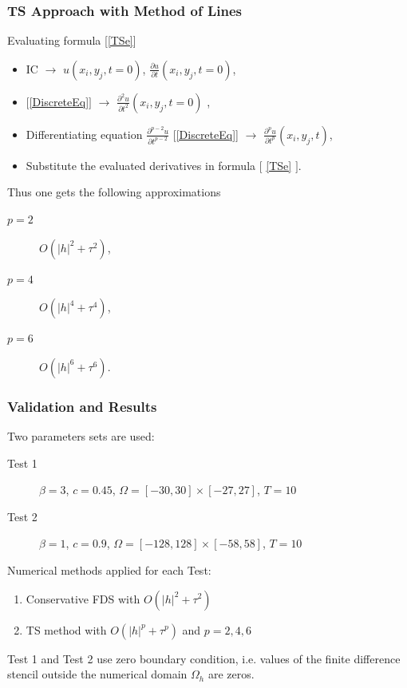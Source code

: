 \documentclass{beamer}
\begin{document}
\begin{frame}
\frametitle{TS Approach with Method of Lines}
Evaluating formula [\ref{TSe}]
\begin{itemize}
 \item IC $\rightarrow$ $u(x_i, y_j, t=0)$, $\frac{ \partial u }{ \partial t }(x_i, y_j, t=0)$,
 \item $[$\ref{DiscreteEq}$]$ $\rightarrow$ $\frac{ \partial^2 u }{ \partial t^2 }(x_i, y_j, t=0)$ ,
 \item Differentiating equation $\frac{ \partial^{p-2} u }{ \partial t^{p-2} }$ [\ref{DiscreteEq}] $\rightarrow$  $\frac{ \partial^p u }{ \partial t^p }(x_i, y_j, t)$,
 \item Substitute the evaluated derivatives in formula $[$ \ref{TSe} $]$.
\end{itemize}


Thus one gets the following approximations
\begin{description}
 \item[$p=2$] $O(|h|^2 + \tau^2)$,
 \item[$p=4$] $O(|h|^4 + \tau^4)$,
 \item[$p=6$] $O(|h|^6 + \tau^6)$.
\end{description}
\end{frame}


\begin{frame}
\frametitle{Validation and Results}
Two parameters sets are used:
\begin{description}
 \item[Test 1] $\beta = 3$, $c = 0.45$, $\Omega = [-30, 30] \times [-27, 27]$, $T = 10$
 \item[Test 2] $\beta = 1$, $c = 0.9$, $\Omega = [-128, 128] \times [-58, 58]$, $T = 10$
\end{description}

Numerical methods applied for each Test:
\begin{enumerate}
  \item Conservative FDS with $O(|h|^2 + \tau^2)$
  \item TS method with $O(|h|^p + \tau^p)$ and $p = 2, 4, 6$
\end{enumerate}

Test 1 and Test 2 use zero boundary condition, i.e. values of the finite difference stencil outside the numerical domain $\Omega_h$ are zeros.
\end{frame}
\end{document}

